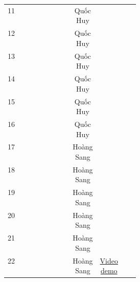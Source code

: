\documentclass[12pt, a4paper]{article}
\begin{document}
\begin{table}[!H]
\begin{tabular}{|c|c|c|p{0.3\linewidth}|c|c|c|c|}
    11 & \centering{30/7/2023} & \centering{7/8/2023} & \centering{Lập trình kết nối Wifi} & Quốc Huy &  \\ \cline{1-6}
    
    12 & \centering{30/7/2023} & \centering{15/8/2023} & \centering{Nhận thông tin từ website} & Quốc Huy &  \\ \cline{1-6}
    
    13 & \centering{24/7/2023} & \centering{15/8/2023} & \centering{Điều khiển các thiết bị theo logic hệ thống (Servo, Lcd, Relay)} & Quốc Huy &  \\ \cline{1-6}
    
    14 & \centering{24/7/2023} & \centering{7/8/2023} & \centering{Tính toán lượng pin, lượng men và phần trăm hoàn thành} & Quốc Huy &  \\ \cline{1-6}
    
    15 & \centering{17/8/2023} & \centering{23/8/2023} & \centering{Kiểm thử, chạy website} & Quốc Huy &  \\ \cline{1-6}
    
    16 & \centering{17/8/2023} & \centering{23/8/2023} & \centering{Báo cáo chi tiết} & Quốc Huy &  \\ \cline{1-6}
    
    17 & \centering{24/7/2023} & \centering{10/8/2023} & \centering{Thiết kế toàn bộ website (login, trang thông số, login, điều khiển, thông báo...)} & Hoàng Sang &  \\ \cline{1-6}

    18 & \centering{24/7/2023} & \centering{10/8/2023} & \centering{Gửi thông tin từ web về mạch (start + weight/stop)} & Hoàng Sang &  \\ \cline{1-6}
    
    19 & \centering{15/8/2023} & \centering{20/8/2023} & \centering{Query thông tin từ Cloud và hiển thị dạng table, để hiển thị lịch sử} & Hoàng Sang &  \\ \cline{1-6}
       
    20 & \centering{15/8/2023} & \centering{20/8/2023} & \centering{Chức năng xóa lịch sử} & Hoàng Sang &  \\ \cline{1-6}
    
    21 & \centering{15/8/2023} & \centering{23/8/2023} & \centering{Kiểm thử, chạy thuật toán từ mạch kết hợp với website} & Hoàng Sang &  \\ \cline{1-6}
    
    22 & \centering{22/8/2023} & \centering{23/8/2023} & \centering{Quay demo} & Hoàng Sang &  \href{https://drive.google.com/drive/u/1/folders/1SFOhzDiOCOt-AMFM7m-FWzQ3i351csu7}{Video demo} \\ \cline{1-6}
    

\end{tabular}
\end{table}
\end{document}
